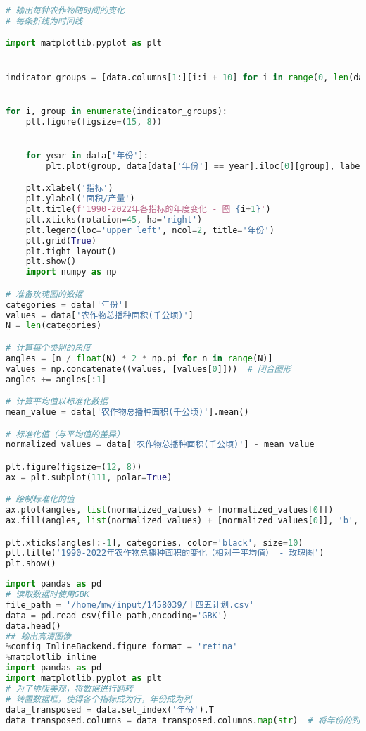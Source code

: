 \begin{lstlisting}[language=python,caption={主要农作物播种面积和产品产量数据
}]
# 输出每种农作物随时间的变化
# 每条折线为时间线

import matplotlib.pyplot as plt


indicator_groups = [data.columns[1:][i:i + 10] for i in range(0, len(data.columns[1:]), 10)]


for i, group in enumerate(indicator_groups):
    plt.figure(figsize=(15, 8))


    for year in data['年份']:
        plt.plot(group, data[data['年份'] == year].iloc[0][group], label=year)

    plt.xlabel('指标')
    plt.ylabel('面积/产量')
    plt.title(f'1990-2022年各指标的年度变化 - 图 {i+1}')
    plt.xticks(rotation=45, ha='right')
    plt.legend(loc='upper left', ncol=2, title='年份')
    plt.grid(True)
    plt.tight_layout()
    plt.show()
    import numpy as np

# 准备玫瑰图的数据
categories = data['年份']
values = data['农作物总播种面积(千公顷)']
N = len(categories)

# 计算每个类别的角度
angles = [n / float(N) * 2 * np.pi for n in range(N)]
values = np.concatenate((values, [values[0]]))  # 闭合图形
angles += angles[:1]

# 计算平均值以标准化数据
mean_value = data['农作物总播种面积(千公顷)'].mean()

# 标准化值（与平均值的差异）
normalized_values = data['农作物总播种面积(千公顷)'] - mean_value

plt.figure(figsize=(12, 8))
ax = plt.subplot(111, polar=True)

# 绘制标准化的值
ax.plot(angles, list(normalized_values) + [normalized_values[0]])
ax.fill(angles, list(normalized_values) + [normalized_values[0]], 'b', alpha=0.1)

plt.xticks(angles[:-1], categories, color='black', size=10)
plt.title('1990-2022年农作物总播种面积的变化（相对于平均值） - 玫瑰图')
plt.show()


\end{lstlisting}\begin{lstlisting}[language=python,caption={十四五规划可视化}]
import pandas as pd
# 读取数据时使用GBK
file_path = '/home/mw/input/1458039/十四五计划.csv'
data = pd.read_csv(file_path,encoding='GBK')
data.head()
## 输出高清图像
%config InlineBackend.figure_format = 'retina'
%matplotlib inline
import pandas as pd
import matplotlib.pyplot as plt
# 为了排版美观，将数据进行翻转
# 转置数据框，使得各个指标成为行，年份成为列
data_transposed = data.set_index('年份').T
data_transposed.columns = data_transposed.columns.map(str)  # 将年份的列名转换为字符串


\end{lstlisting}
